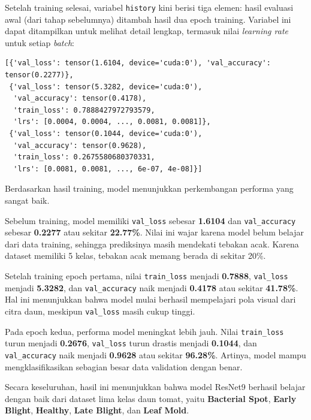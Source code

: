 Setelah training selesai, variabel \texttt{history} kini berisi tiga elemen: hasil evaluasi awal (dari tahap sebelumnya) ditambah hasil dua epoch training. Variabel ini dapat ditampilkan untuk melihat detail lengkap, termasuk nilai \textit{learning rate} untuk setiap \textit{batch}:

\begin{outputcode}[H]
\begin{lstlisting}[language={}]
[{'val_loss': tensor(1.6104, device='cuda:0'), 'val_accuracy': tensor(0.2277)},
 {'val_loss': tensor(5.3282, device='cuda:0'),
  'val_accuracy': tensor(0.4178),
  'train_loss': 0.7888427972793579,
  'lrs': [0.0004, 0.0004, ..., 0.0081, 0.0081]},
 {'val_loss': tensor(0.1044, device='cuda:0'),
  'val_accuracy': tensor(0.9628),
  'train_loss': 0.2675580680370331,
  'lrs': [0.0081, 0.0081, ..., 6e-07, 4e-08]}]
\end{lstlisting}
\caption{Output history training (LR list diringkas)}
\end{outputcode}

Berdasarkan hasil training, model menunjukkan perkembangan performa yang sangat baik.

Sebelum training, model memiliki \texttt{val\_loss} sebesar \textbf{1.6104} dan \texttt{val\_accuracy} sebesar \textbf{0.2277} atau sekitar \textbf{22.77\%}. Nilai ini wajar karena model belum belajar dari data training, sehingga prediksinya masih mendekati tebakan acak. Karena dataset memiliki 5 kelas, tebakan acak memang berada di sekitar 20\%.

Setelah training epoch pertama, nilai \texttt{train\_loss} menjadi \textbf{0.7888}, \texttt{val\_loss} menjadi \textbf{5.3282}, dan \texttt{val\_accuracy} naik menjadi \textbf{0.4178} atau sekitar \textbf{41.78\%}. Hal ini menunjukkan bahwa model mulai berhasil mempelajari pola visual dari citra daun, meskipun \texttt{val\_loss} masih cukup tinggi.

Pada epoch kedua, performa model meningkat lebih jauh. Nilai \texttt{train\_loss} turun menjadi \textbf{0.2676}, \texttt{val\_loss} turun drastis menjadi \textbf{0.1044}, dan \texttt{val\_accuracy} naik menjadi \textbf{0.9628} atau sekitar \textbf{96.28\%}. Artinya, model mampu mengklasifikasikan sebagian besar data validation dengan benar.

Secara keseluruhan, hasil ini menunjukkan bahwa model ResNet9 berhasil belajar dengan baik dari dataset lima kelas daun tomat, yaitu \textbf{Bacterial Spot}, \textbf{Early Blight}, \textbf{Healthy}, \textbf{Late Blight}, dan \textbf{Leaf Mold}.
